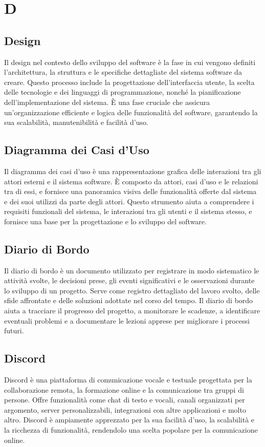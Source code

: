 \section{D} 
\subsection{Design} 
Il design nel contesto dello sviluppo del software è la fase in cui vengono definiti l'architettura, la struttura e le specifiche dettagliate del sistema software da creare. Questo processo include la progettazione dell'interfaccia utente, la scelta delle tecnologie e dei linguaggi di programmazione, nonché la pianificazione dell'implementazione del sistema. È una fase cruciale che assicura un'organizzazione efficiente e logica delle funzionalità del software, garantendo la sua scalabilità, manutenibilità e facilità d'uso.
\subsection{Diagramma dei Casi d'Uso} 
Il diagramma dei casi d'uso è una rappresentazione grafica delle interazioni tra gli attori esterni e il sistema software. È composto da attori, casi d'uso e le relazioni tra di essi, e fornisce una panoramica visiva delle funzionalità offerte dal sistema e dei suoi utilizzi da parte degli attori. Questo strumento aiuta a comprendere i requisiti funzionali del sistema, le interazioni tra gli utenti e il sistema stesso, e fornisce una base per la progettazione e lo sviluppo del software.
\subsection{Diario di Bordo} 
Il diario di bordo è un documento utilizzato per registrare in modo sistematico le attività svolte, le decisioni prese, gli eventi significativi e le osservazioni durante lo sviluppo di un progetto. Serve come registro dettagliato del lavoro svolto, delle sfide affrontate e delle soluzioni adottate nel corso del tempo. Il diario di bordo aiuta a tracciare il progresso del progetto, a monitorare le scadenze, a identificare eventuali problemi e a documentare le lezioni apprese per migliorare i processi futuri.
\subsection{Discord} 
Discord è una piattaforma di comunicazione vocale e testuale progettata per la collaborazione remota, la formazione online e la comunicazione tra gruppi di persone. Offre funzionalità come chat di testo e vocali, canali organizzati per argomento, server personalizzabili, integrazioni con altre applicazioni e molto altro. Discord è ampiamente apprezzato per la sua facilità d'uso, la scalabilità e la ricchezza di funzionalità, rendendolo una scelta popolare per la comunicazione online.
